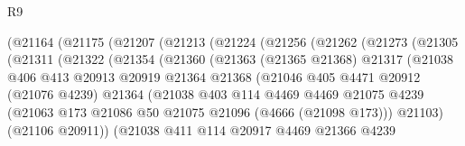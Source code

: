 \begin{lexlean}{R9}
\begin{coremodule}
                (@21164
                  (@21175
                    (@21207
                      (@21213
                        (@21224
                          (@21256
                            (@21262
                              (@21273
                                (@21305
                                  (@21311
                                    (@21322
                                      (@21354
                                        (@21360
                                          (@21363
                                            (@21365 @21368)
                                            @21317
                                            (@21038
                                              @406
                                              @413
                                              @20913
                                              @20919
                                              @21364
                                              @21368
                                              (@21046
                                                @405
                                                @4471
                                                @20912
                                                (@21076 @4239)
                                                @21364
                                                (@21038
                                                  @403
                                                  @114
                                                  @4469
                                                  @4469
                                                  @21075
                                                  @4239
                                                  (@21063
                                                    @173
                                                    @21086
                                                    @50
                                                    @21075
                                                    @21096
                                                    (@4666 (@21098 @173)))
                                                  @21103)
                                                (@21106 @20911))
                                              (@21038
                                                @411
                                                @114
                                                @20917
                                                @4469
                                                @21366
                                                @4239

\end{coremodule}
\end{lexlean}
